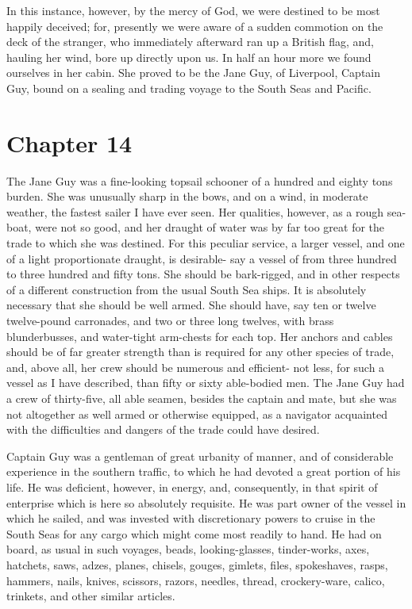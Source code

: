 In this
instance, however, by the mercy of God, we were destined to be most happily
deceived; for, presently we were aware of a sudden commotion on the deck of the
stranger, who immediately afterward ran up a British flag, and, hauling her
wind, bore up directly upon us. In half an hour more we found ourselves in her
cabin. She proved to be the Jane Guy, of Liverpool, Captain Guy, bound on a
sealing and trading voyage to the South Seas and Pacific. 


\section{Chapter 14}
The Jane Guy was a fine-looking topsail schooner of a hundred and eighty tons
burden. She was unusually sharp in the bows, and on a wind, in moderate weather,
the fastest sailer I have ever seen. Her qualities, however, as a rough
sea-boat, were not so good, and her draught of water was by far too great for
the trade to which she was destined. For this peculiar service, a larger vessel,
and one of a light proportionate draught, is desirable- say a vessel of from
three hundred to three hundred and fifty tons. She should be bark-rigged, and in
other respects of a different construction from the usual South Sea ships. It is
absolutely necessary that she should be well armed. She should have, say ten or
twelve twelve-pound carronades, and two or three long twelves, with brass
blunderbusses, and water-tight arm-chests for each top. Her anchors and cables
should be of far greater strength than is required for any other species of
trade, and, above all, her crew should be numerous and efficient- not less, for
such a vessel as I have described, than fifty or sixty able-bodied men. The Jane
Guy had a crew of thirty-five, all able seamen, besides the captain and mate,
but she was not altogether as well armed or otherwise equipped, as a navigator
acquainted with the difficulties and dangers of the trade could have
desired. 

Captain Guy was a gentleman of great urbanity of manner, and of considerable
experience in the southern traffic, to which he had devoted a great portion of
his life. He was deficient, however, in energy, and, consequently, in that
spirit of enterprise which is here so absolutely requisite. He was part owner of
the vessel in which he sailed, and was invested with discretionary powers to
cruise in the South Seas for any cargo which might come most readily to hand. He
had on board, as usual in such voyages, beads, looking-glasses, tinder-works,
axes, hatchets, saws, adzes, planes, chisels, gouges, gimlets, files,
spokeshaves, rasps, hammers, nails, knives, scissors, razors, needles, thread,
crockery-ware, calico, trinkets, and other similar articles. 

